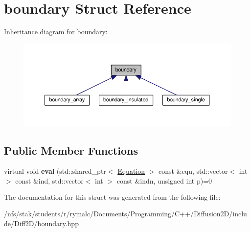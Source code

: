 \hypertarget{structboundary}{\section{boundary Struct Reference}
\label{structboundary}
}


Inheritance diagram for boundary\+:\nopagebreak
\begin{figure}[H]
\begin{center}
\leavevmode
\includegraphics[width=350pt]{structboundary__inherit__graph}
\end{center}
\end{figure}
\subsection*{Public Member Functions}
\begin{DoxyCompactItemize}
\item 
\hypertarget{structboundary_a4a74d489d76ae54b9d7993b6f616976c}{virtual void {\bfseries eval} (std\+::shared\+\_\+ptr$<$ \hyperlink{classEquation}{Equation} $>$ const \&equ, std\+::vector$<$ int $>$ const \&ind, std\+::vector$<$ int $>$ const \&indn, unsigned int p)=0}\label{structboundary_a4a74d489d76ae54b9d7993b6f616976c}

\end{DoxyCompactItemize}


The documentation for this struct was generated from the following file\+:\begin{DoxyCompactItemize}
\item 
/nfs/stak/students/r/rymalc/\+Documents/\+Programming/\+C++/\+Diffusion2\+D/include/\+Diff2\+D/boundary.\+hpp\end{DoxyCompactItemize}
